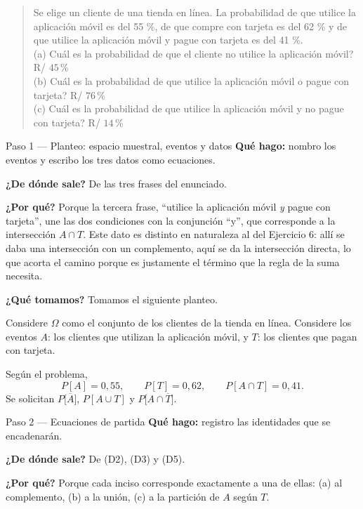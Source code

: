 \documentclass[11pt]{article}
\begin{document}
\begin{quote}
Se elige un cliente de una tienda en línea. La probabilidad de que utilice la aplicación móvil es
del 55 \%, de que compre con tarjeta es del 62 \% y de que utilice la aplicación móvil y pague
con tarjeta es del 41 \%.\\
(a) Cuál es la probabilidad de que el cliente no utilice la aplicación móvil? \hfill R/ $45$\,\%\\
(b) Cuál es la probabilidad de que utilice la aplicación móvil o pague con tarjeta? \hfill R/ $76$\,\%\\
(c) Cuál es la probabilidad de que utilice la aplicación móvil y no pague con tarjeta? \hfill R/ $14$\,\%
\end{quote}

\begin{sol}

\begin{paso}{Paso 1 --- Planteo: espacio muestral, eventos y datos}
\textbf{Qué hago:} nombro los eventos y escribo los tres datos como ecuaciones.

\textbf{¿De dónde sale?} De las tres frases del enunciado.

\textbf{¿Por qué?} Porque la tercera frase, ``utilice la aplicación móvil \emph{y} pague con
tarjeta'', une las dos condiciones con la conjunción ``y'', que corresponde a la intersección
$A\cap T$. Este dato es distinto en naturaleza al del Ejercicio 6: allí se daba una intersección
con un complemento, aquí se da la intersección directa, lo que acorta el camino porque es
justamente el término que la regla de la suma necesita.

\textbf{¿Qué tomamos?} Tomamos el siguiente planteo.

\medskip
Considere $\Omega$ como el conjunto de los clientes de la tienda en línea. Considere los eventos
$A$: los clientes que utilizan la aplicación móvil, y $T$: los clientes que pagan con tarjeta.

Según el problema,
\[
P[A]=0{,}55,\qquad P[T]=0{,}62,\qquad P[A\cap T]=0{,}41 .
\]
Se solicitan $P\big[\overline{A}\big]$, $P[A\cup T]$ y $P\big[A\cap\overline{T}\big]$.
\end{paso}

\begin{paso}{Paso 2 --- Ecuaciones de partida}
\textbf{Qué hago:} registro las identidades que se encadenarán.

\textbf{¿De dónde sale?} De (D2), (D3) y (D5).

\textbf{¿Por qué?} Porque cada inciso corresponde exactamente a una de ellas: (a) al
complemento, (b) a la unión, (c) a la partición de $A$ según $T$.


\end{paso}
\end{sol}
\end{document}
